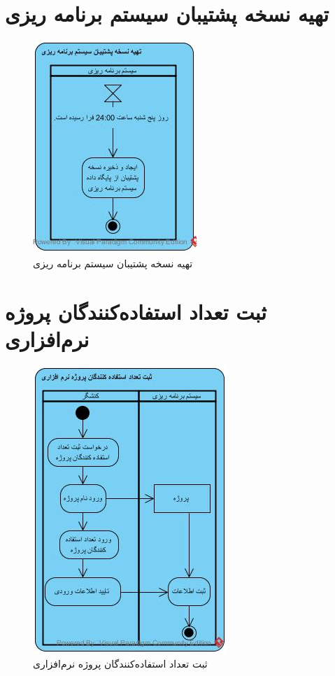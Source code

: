 \section{تهیه نسخه پشتیبان سیستم برنامه ریزی}
\begin{figure}[H]
	\centering
	\includegraphics[scale=1]{img/activity/Support}
	\caption{تهیه نسخه پشتیبان سیستم برنامه ریزی}
\end{figure}

\section{ثبت تعداد استفاده‌کنندگان پروژه نرم‌افزاری}
\begin{figure}[H]
	\centering
	\includegraphics[scale=1]{img/activity/AddUsersCount}
	\caption{ثبت تعداد استفاده‌کنندگان پروژه نرم‌افزاری}
\end{figure}


